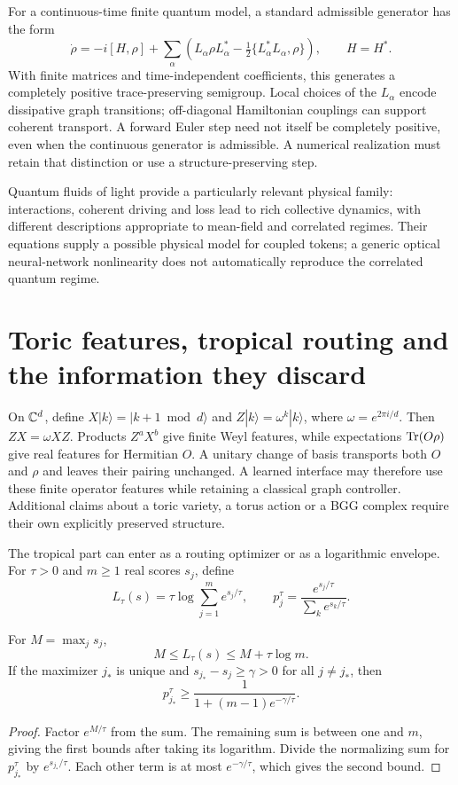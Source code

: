 For a continuous-time finite quantum model, a standard admissible generator
has the form
\[
 \dot\rho=-i[H,\rho]+\sum_\alpha
 \left(L_\alpha\rho L_\alpha^*
 -\tfrac12\{L_\alpha^*L_\alpha,\rho\}\right),
 \qquad H=H^*.
\]
With finite matrices and time-independent coefficients, this generates a
completely positive trace-preserving semigroup.\cite{qtsLindblad1976}
Local choices of the $L_\alpha$ encode dissipative graph transitions;
off-diagonal Hamiltonian couplings can support coherent transport. A forward
Euler step need not itself be completely positive, even when the continuous
generator is admissible. A numerical realization must retain that
distinction or use a structure-preserving step.

Quantum fluids of light provide a particularly relevant physical family:
interactions, coherent driving and loss lead to rich collective dynamics,
with different descriptions appropriate to mean-field and correlated
regimes. Their equations supply a possible physical model for coupled
tokens; a generic optical neural-network nonlinearity does not automatically
reproduce the correlated quantum regime.\cite{qtsCarusottoCiuti2013,qtsAmo2009}

\section{Toric features, tropical routing and the information they discard}

On $\mathbb{C}^d$, define $X|k\rangle=|k+1\bmod d\rangle$ and
$Z|k\rangle=\omega^k|k\rangle$, where $\omega=e^{2\pi i/d}$. Then
$ZX=\omega XZ$. Products $Z^aX^b$ give finite Weyl features, while
expectations $\operatorname{Tr}(O\rho)$ give real features for Hermitian $O$.
A unitary change of basis transports both $O$ and $\rho$ and leaves their
pairing unchanged. A learned interface may therefore use these finite
operator features while retaining a classical graph controller. Additional
claims about a toric variety, a torus action or a BGG complex require their
own explicitly preserved structure.

The tropical part can enter as a routing optimizer or as a logarithmic
envelope. For $\tau>0$ and $m\ge1$ real scores $s_j$, define
\[
 L_\tau(s)=\tau\log\sum_{j=1}^m e^{s_j/\tau},\qquad
 p_j^\tau=\frac{e^{s_j/\tau}}{\sum_k e^{s_k/\tau}}.
\]

\begin{proposition}
\label{prop:qtf-tropical-limit}
For $M=\max_js_j$,
\[
 M\le L_\tau(s)\le M+\tau\log m.
\]
If the maximizer $j_*$ is unique and
$s_{j_*}-s_j\ge\gamma>0$ for all $j\ne j_*$, then
\[
 p_{j_*}^\tau\ge
 \frac{1}{1+(m-1)e^{-\gamma/\tau}}.
\]
\end{proposition}
\begin{proof}
Factor $e^{M/\tau}$ from the sum. The remaining sum is between one and
$m$, giving the first bounds after taking its logarithm. Divide the
normalizing sum for $p_{j_*}^\tau$ by $e^{s_{j_*}/\tau}$.
Each other term is at most $e^{-\gamma/\tau}$, which gives the second
bound.
\end{proof}


